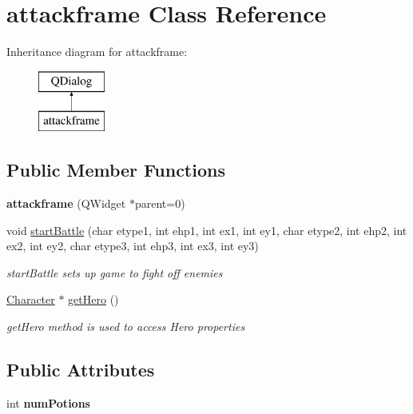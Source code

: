 \hypertarget{classattackframe}{\section{attackframe Class Reference}
\label{classattackframe}
}
Inheritance diagram for attackframe\-:\begin{figure}[H]
\begin{center}
\leavevmode
\includegraphics[height=2.000000cm]{classattackframe}
\end{center}
\end{figure}
\subsection*{Public Member Functions}
\begin{DoxyCompactItemize}
\item 
\hypertarget{classattackframe_a4093d85f3f3400f00cca4ffdb87c858d}{{\bfseries attackframe} (Q\-Widget $\ast$parent=0)}\label{classattackframe_a4093d85f3f3400f00cca4ffdb87c858d}

\item 
void \hyperlink{classattackframe_a708bc137367ff5315da0a7f62c1f8494}{start\-Battle} (char etype1, int ehp1, int ex1, int ey1, char etype2, int ehp2, int ex2, int ey2, char etype3, int ehp3, int ex3, int ey3)
\begin{DoxyCompactList}\small\item\em start\-Battle sets up game to fight off enemies \end{DoxyCompactList}\item 
\hyperlink{class_character}{Character} $\ast$ \hyperlink{classattackframe_a1806dca8de141292ba69c8d79609f8d6}{get\-Hero} ()
\begin{DoxyCompactList}\small\item\em get\-Hero method is used to access Hero properties \end{DoxyCompactList}\end{DoxyCompactItemize}
\subsection*{Public Attributes}
\begin{DoxyCompactItemize}
\item 
\hypertarget{classattackframe_a419e0dcfdbae9999b46144a90fff2e37}{int {\bfseries num\-Potions}}\label{classattackframe_a419e0dcfdbae9999b46144a90fff2e37}

\end{DoxyCompactItemize}
